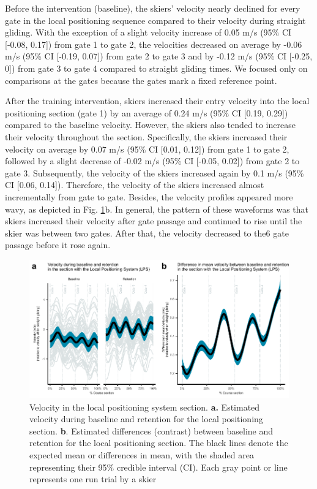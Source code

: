 \documentclass{article}
\begin{document}
Before the intervention (baseline), the skiers' velocity nearly declined for every gate in the local positioning sequence compared to their velocity during straight gliding. With the exception of a slight velocity increase of 0.05 m/s (95\% CI [-0.08, 0.17]) from gate 1 to gate 2, the velocities decreased on average by -0.06 m/s (95\% CI [-0.19, 0.07]) from gate 2 to gate 3 and by -0.12 m/s (95\% CI [-0.25, 0]) from gate 3 to gate 4 compared to straight gliding times. We focused only on comparisons at the gates because the gates mark a fixed reference point. 

After the training intervention, skiers increased their entry velocity into the local positioning section (gate 1) by an average of 0.24 m/s (95\% CI [0.19, 0.29]) compared to the baseline velocity. However, the skiers also tended to increase their velocity throughout the section. Specifically, the skiers increased their velocity on average by 0.07 m/s (95\% CI [0.01, 0.12]) from gate 1 to gate 2, followed by a slight decrease of -0.02 m/s (95\% CI [-0.05, 0.02]) from gate 2 to gate 3. Subsequently, the velocity of the skiers increased again by 0.1 m/s (95\% CI [0.06, 0.14]). Therefore, the velocity of the skiers increased almost incrementally from gate to gate. Besides, the velocity profiles appeared more wavy, as depicted in Fig. \ref{fig: velocity}b. In general, the pattern of these waveforms was that skiers increased their velocity after gate passage and continued to rise until the skier was between two gates. After that, the velocity decreased to the6 gate passage before it rose again. 

\begin{figure}[H]
\centering
\includegraphics{figurer/figure_velocity_2.pdf}
\caption{Velocity in the local positioning system section. \textbf{a.} Estimated velocity during baseline and retention for the local positioning section. \textbf{b}. Estimated differences (contrast) between baseline and retention for the local positioning section. The black lines denote the expected mean or differences in mean, with the shaded area representing their 95\% credible interval (CI). Each gray point or line represents one run trial by a skier}\label{fig: velocity}
\end{figure}
\end{document}
